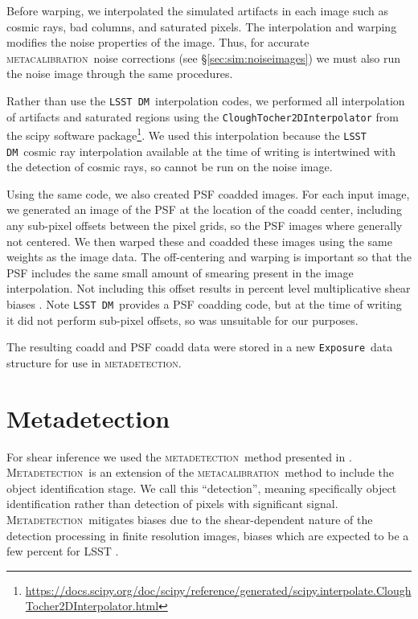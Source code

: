 \documentclass[twocolumn,twocolappendix,astrosym]{openjournal}
\newcommand{\calexp}{\texttt{Exposure}}
\newcommand{\dm}{\texttt{LSST DM}}
\newcommand{\mcal}{\textsc{metacalibration}}
\newcommand{\mdet}{\textsc{metadetection}}
\newcommand{\Mdet}{\textsc{Metadetection}}
\begin{document}
Before warping, we interpolated the simulated artifacts in each image such as
cosmic rays, bad columns, and saturated pixels.  The interpolation and warping
modifies the noise properties of the image.  Thus, for accurate \mcal\ noise
corrections (see \S \ref{sec:sim:noiseimages}) we must also run the noise image
through the same procedures.

Rather than use the \dm\ interpolation codes, we performed all
interpolation of artifacts and saturated regions using the
\texttt{CloughTocher2DInterpolator} from the scipy software
package\footnote{\url{https://docs.scipy.org/doc/scipy/reference/generated/scipy.interpolate.CloughTocher2DInterpolator.html}}.
We used this interpolation because the \dm\ cosmic ray interpolation available
at the time of writing is intertwined with the detection of cosmic rays, so
cannot be run on the noise image.

Using the same code, we also created PSF coadded images.  For each input image,
we generated an image of the PSF at the location of the coadd center, including
any sub-pixel offsets between the pixel grids, so the PSF images where
generally not centered.  We then warped these and coadded these images using
the same weights as the image data.  The off-centering and warping is important
so that the PSF includes the same small amount of smearing present in the image
interpolation.  Not including this offset results in percent level
multiplicative shear biases \citep{ArmstrongCoadd}.  Note \dm\ provides a
PSF coadding code, but at the time of writing it did not perform sub-pixel
offsets, so was unsuitable for our purposes.

The resulting coadd and PSF coadd data were stored in a new \calexp\ data
structure for use in \mdet.

\section{Metadetection} \label{sec:mdet}

For shear inference we used the \mdet\ method presented in \cite{mdet20}.
\Mdet\ is an extension of the \mcal\ method
\citep{HuffMcal2017,SheldonMcal2017} to include the object identification
stage. We call this ``detection'', meaning specifically object identification
rather than detection of pixels with significant signal.  \Mdet\ mitigates
biases due to the shear-dependent nature of the detection processing in finite
resolution images, biases which are expected to be a few percent for LSST
\citep{mdet20}.
\end{document}
